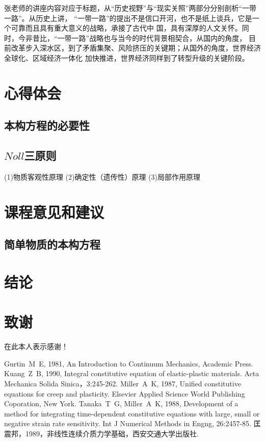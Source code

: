 \documentclass[a4paper]{cctart}
\numberwithin{equation}{section} \pagestyle{fancy}
\begin{document}
张老师的讲座内容对应于标题，从“历史视野”与“现实关照”两部分分别剖析“一带一路”。从历史上讲，
“一带一路”的提出不是信口开河，也不是纸上谈兵，它是一个可靠而且具有重大意义的战略，承接了古代中
国，具有深厚的人文关怀。同时，今非昔比，“一带一路”战略也与当今的时代背景相契合，从国内的角度，
目前改革步入深水区，到了矛盾集聚、风险挤压的关键期；从国外的角度，世界经济全球化、区域经济一体化
加快推进，世界经济同样到了转型升级的关键阶段。

\DeclareRobustCommand\CTeX{$\mathbb{C}$\kern-.05em\TeX{}}

\section{心得体会}\label{2}
\subsection{本构方程的必要性}


\subsection{$Noll$三原则}

(1){\kaishu 物质客观性原理}
(2){\kaishu 确定性（遗传性）原理}
(3){\kaishu 局部作用原理}


\section{课程意见和建议}\label{3}



\subsection{简单物质的本构方程}


\section{结论}

\section{致谢}
在此本人表示感谢！

\begin{thebibliography}{9}
Gurtin~M~E, 1981, An Introduction to Continuum
Mechanics, Academic Press.
Kuang~Z~B, 1990, Integral constitutive equation
of elastic-plastic materials. Acta Mechanica Solida
Sinica，3:245-262.
Miller~A~K, 1987, Unified constitutive equations
for creep and plasticity. Elsevier Applied Science World
Publishing Coporation, New York.
Tanaka~T~G, Miller~A~K, 1988, Development of a
method for integrating time-dependent constitutive equations with
large, small or negative strain rate sensitivity. Int J Numerical
Methods in Engng, 26:2457-85.
 匡震邦，1989，非线性连续介质力学基础，西安交通大学出版社.
\end{thebibliography}
\end{document}
